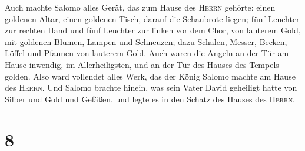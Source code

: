  Auch machte Salomo alles Gerät, das zum Hause des
\textsc{Herrn} gehörte: einen goldenen Altar, einen goldenen Tisch,
darauf die Schaubrote liegen;  fünf Leuchter zur rechten
Hand und fünf Leuchter zur linken vor dem Chor, von lauterem Gold, mit
goldenen Blumen, Lampen und Schneuzen;  dazu Schalen,
Messer, Becken, Löffel und Pfannen von lauterem Gold. Auch waren die
Angeln an der Tür am Hause inwendig, im Allerheiligsten, und an der Tür
des Hauses des Tempels golden.  Also ward vollendet alles
Werk, das der König Salomo machte am Hause des \textsc{Herrn}. Und
Salomo brachte hinein, was sein Vater David geheiligt hatte von Silber
und Gold und Gefäßen, und legte es in den Schatz des Hauses des
\textsc{Herrn}.

\hypertarget{section-7}{%
\section{8}\label{section-7}}

